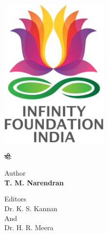 \thispagestyle{empty}

\includegraphics{images/logo.png}

\begin{center}
श्रीः
\end{center}


Author\\\textbf{T. M. Narendran}

Editors\\ Dr. K. S. Kannan\\ And\\ Dr. H. R. Meera

